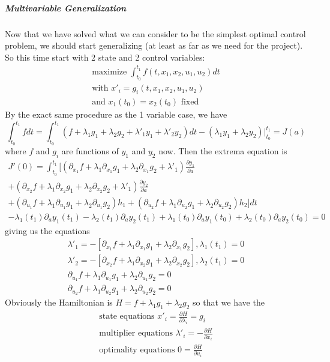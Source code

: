 \documentclass[11pt]{article}
\numberwithin{equation}{section}
\begin{document}
\subparagraph{Multivariable Generalization}
Now that we have solved what we can consider to be the simplest optimal control problem, we should start generalizing (at least as far as we need for the project). So this time start with 2 state and 2 control variables:
\begin{align}
\text{maximize } \int_{t_0}^{t_1}f(t,x_1,x_2,u_1,u_2)dt \\
\text{with } x'_i = g_i(t,x_1,x_2,u_1,u_2) \\
\text{and } x_1(t_0) = x_2(t_0) \text{ fixed}
\end{align}
By the exact same procedure as the 1 variable case, we have
\begin{equation}
\int_{t_0}^{t_1}fdt = \int_{t_0}^{t_1}(f + \lambda_1g_1 + \lambda_2g_2 + \lambda'_1y_1 + \lambda'_2y_2)dt - (\lambda_1y_1 + \lambda_2y_2)|_{t_0}^{t_1} = J(a)
\end{equation}
where $f$ and $g_i$ are functions of $y_1$ and $y_2$ now. Then the extrema equation is 
\begin{align}
J'(0) = \int_{t_0}^{t_1}\big[(\partial_{x_1}f + \lambda_1\partial_{x_1}g_1 + \lambda_2\partial_{x_1}g_2 + \lambda'_1)\frac{\partial y_1}{\partial a} \\
+ (\partial_{x_2}f + \lambda_1\partial_{x_2}g_1 + \lambda_2\partial_{x_2}g_2 + \lambda'_1)\frac{\partial y_2}{\partial a} \\
+ (\partial_{u_1}f + \lambda_1\partial_{u_1}g_1 + \lambda_2\partial_{u_1}g_2)h_1 + (\partial_{u_2}f + \lambda_1\partial_{u_2}g_1 + \lambda_2\partial_{u_2}g_2)h_2\big]dt \\
- \lambda_1(t_1)\partial_ay_1(t_1) - \lambda_2(t_1)\partial_ay_2(t_1) + \lambda_1(t_0)\partial_ay_1(t_0) + \lambda_2(t_0)\partial_ay_2(t_0) = 0
\end{align}
giving us the equations
\begin{align}
\lambda'_1 = -[\partial_{x_1}f + \lambda_1\partial_{x_1}g_1 + \lambda_2\partial_{x_1}g_2], \lambda_1(t_1) = 0 \\
\lambda'_2 = -[\partial_{x_2}f + \lambda_1\partial_{x_2}g_1 + \lambda_2\partial_{x_2}g_2], \lambda_2(t_1) = 0 \\
\partial_{u_1}f + \lambda_1\partial_{u_1}g_1 + \lambda_2\partial_{u_1}g_2 = 0 \\
\partial_{u_2}f + \lambda_1\partial_{u_2}g_1 + \lambda_2\partial_{u_2}g_2 = 0
\end{align}
Obviously the Hamiltonian is $H = f + \lambda_1g_1 + \lambda_2g_2$ so that we have the 
\begin{align}
\text{state equations } x'_i = \frac{\partial H}{\partial \lambda_i} = g_i \\
\text{multiplier equations } \lambda'_i = -\frac{\partial H}{\partial x_i} \\
\text{optimality equations } 0 = \frac{\partial H}{\partial u_i}
\end{align}
\end{document}
